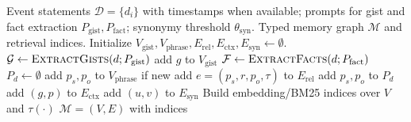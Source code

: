 \documentclass{article} %
\begin{document}
\begin{algorithm}[tb]
\caption{Indexing$(\mathcal{D}; P_{\text{gist}}, P_{\text{fact}}, \theta_{\text{syn}})$}
\label{alg:index}
\begin{algorithmic}[1]
\Require Event statements $\mathcal{D}=\{d_i\}$ with timestamps when available; prompts for gist and fact extraction $P_{\text{gist}}, P_{\text{fact}}$; synonymy threshold $\theta_{\text{syn}}$.
\Ensure Typed memory graph $\mathcal{M}$ and retrieval indices.
\State Initialize $V_{\text{gist}}, V_{\text{phrase}}, E_{\text{rel}}, E_{\text{ctx}}, E_{\text{syn}} \gets \emptyset$.
  \State $\mathcal{G} \gets \textsc{ExtractGists}(d; P_{\text{gist}})$ 
    \State add $g$ to $V_{\text{gist}}$
  \EndFor
  \State $\mathcal{F} \gets \textsc{ExtractFacts}(d; P_{\text{fact}})$ 
  \State $P_d \gets \emptyset$ 
    \State add $p_s,p_o$ to $V_{\text{phrase}}$ if new
    \State add $e=(p_s,r,p_o,\tau)$ to $E_{\text{rel}}$
    \State add $p_s,p_o$ to $P_d$
  \EndFor
      \State add $(g,p)$ to $E_{\text{ctx}}$ 
    \EndFor
  \EndFor
\EndFor
{}
    \State add $(u,v)$ to $E_{\text{syn}}$ 
  \EndIf
\EndFor
\State Build embedding/BM25 indices over $V$ and $\tau(\cdot)$
\State \Return $\mathcal{M}=(V,E)$ with indices
\end{algorithmic}
\end{algorithm}
\end{document}
